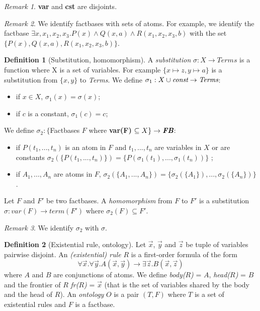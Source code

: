 \documentclass{article}
\theoremstyle{definition}
\newtheorem{definition}{Definition}[section]
\theoremstyle{remark}
\newtheorem{remark}{Remark}[section]
\begin{document}
\begin{remark} 
\textbf{var} and \textbf{cst} are disjoints.
\end{remark}

\begin{remark} We identify factbases with sets of atoms. For example, we identify the factbase $\exists x,x_{1},x_{2},x_{3}. P(x) \land Q(x,a) \land R(x_{1},x_{2},x_{3},b)$ with the set
$\{P(x),Q(x,a),R(x_{1},x_{2},x_{3},b)\}$.
\end{remark}

\begin{definition}[Substitution, homomorphism]
A \emph{substitution} $\sigma:X \to \textit{Terms}$ is a function where X is a set of variables. For example $\{x \mapsto z, y \mapsto a \}$ is a substitution from $\{x,y\}$ to \textit{Terms}. We define $\sigma_1:X \cup \emph{const} \to \textit{Terms}$:
\begin{itemize}
\item if $x \in X$, $\sigma_1(x) = \sigma(x)$;
\item if $c$ is a constant, $\sigma_1(c) = c$;
\end{itemize}
We define $\sigma_2:\{$Factbases $F$ where \textbf{var(F)} $\subseteq X\} \to \textit{\textbf{FB}}$:
\begin{itemize}
\item if $P(t_{1},...,t_{n})$ is an atom in $F$ and $t_1,...,t_n$ are variables in $X$ or are constants $\sigma_2(\{P(t_{1},...,t_{n})\}) = \{P(\sigma_1(t_{1}),...,\sigma_1(t_{n}))\}$ ;
\item if $A_{1},...,A_{n}$ are atoms in $F$, $\sigma_2(\{A_{1},...,A_{n}\}) = \{\sigma_2(\{A_{1}\}),...,\sigma_2(\{A_{n}\})\}$.
\end{itemize}
Let $F$ and $F'$ be two factbases. A \emph{homomorphism} from $F$ to $F'$ is a substitution $\sigma:var(F) \to term(F')$ where $\sigma_2(F) \subseteq F'$.
\end{definition}

\begin{remark}
We identify $\sigma_2$ with $\sigma$.
\end{remark}

\begin{definition}[Existential rule, ontology]
Let $\vec x$, $\vec y$ and $\vec z$ be tuple of variables pairwise disjoint. An \emph{(existential) rule} $R$ is a first-order formula	of the form $$\forall \vec x.\forall \vec y. A(\vec x,\vec y) \rightarrow \exists \vec z. B(\vec x,\vec z)$$ where $A$ and $B$ are conjunctions of atoms. We define \emph{body($R$)} = $A$, \emph{head($R$)} = $B$ and the frontier of $R$ \emph{fr($R$)} = $\vec x$ (that is the set of variables shared by the body and the head of $R$). An \emph{ontology} $O$ is a pair $(T,F)$ where $T$ is a set of existential rules and $F$ is a factbase.
\end{definition}
\end{document}
